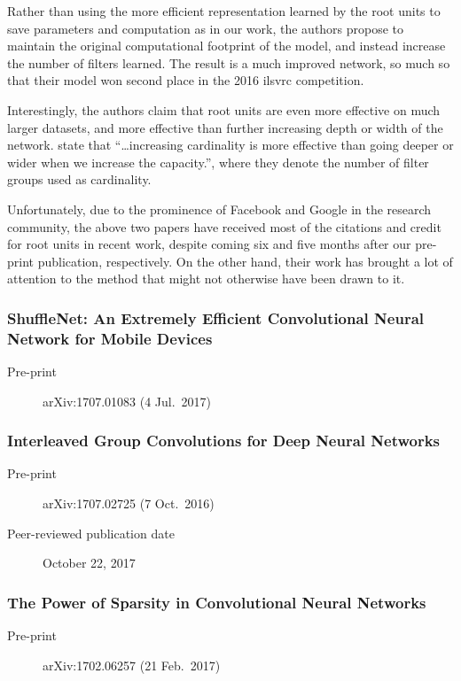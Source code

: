 \documentclass[thesis]{subfiles}
\begin{document}
Rather than using the more efficient representation learned by the root units to save parameters and computation as in our work, the authors propose to maintain the original computational footprint of the model, and instead increase the number of filters learned. The result is a much improved network, so much so that their model won second place in the 2016 \gls{ilsvrc} competition. 

Interestingly, the authors claim that root units are even more effective on much larger datasets, and more effective than further increasing depth or width of the network. \citet{saining2017} state that ``\ldots increasing cardinality is more effective than going deeper or wider when we increase the capacity.'', where they denote the number of filter groups used as cardinality.

Unfortunately, due to the prominence of Facebook and Google in the research community, the above two papers have received most of the citations and credit for root units in recent work, despite coming six and five months after our pre-print publication, respectively. On the other hand, their work has brought a lot of attention to the method that might not otherwise have been drawn to it.

\subsubsection*{ShuffleNet: An Extremely Efficient Convolutional
Neural Network for Mobile Devices}
\begin{description}
    \item[Pre-print] arXiv:1707.01083 (4 Jul.\ 2017)
\end{description}
\citet{zhang2017shufflenet}

\subsubsection*{Interleaved Group Convolutions for Deep Neural Networks}
\begin{description}
    \item[Pre-print] arXiv:1707.02725 (7 Oct.\ 2016)
    \item[Peer-reviewed publication date] October 22, 2017
\end{description}
\citet{zhang2017primal}

\subsubsection*{The Power of Sparsity in Convolutional Neural Networks}
\begin{description}
    \item[Pre-print] arXiv:1702.06257 (21 Feb.\ 2017)
\end{description}
\citet{changpinyo2017power}
\end{document}
